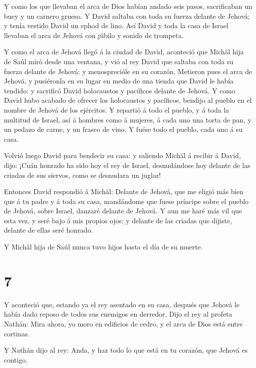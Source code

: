  Y como los que llevaban el arca de Dios habían andado seis
pasos, sacrificaban un buey y un carnero grueso.  Y David
saltaba con toda su fuerza delante de Jehová; y tenía vestido David un
ephod de lino.  Así David y toda la casa de Israel llevaban
el arca de Jehová con júbilo y sonido de trompeta.

 Y como el arca de Jehová llegó á la ciudad de David,
aconteció que Michâl hija de Saúl miró desde una ventana, y vió al rey
David que saltaba con toda su fuerza delante de Jehová: y menosprecióle
en su corazón.  Metieron pues el arca de Jehová, y
pusiéronla en su lugar en medio de una tienda que David le había
tendido: y sacrificó David holocaustos y pacíficos delante de Jehová.
 Y como David hubo acabado de ofrecer los holocaustos y
pacíficos, bendijo al pueblo en el nombre de Jehová de los ejércitos.
 Y repartió á todo el pueblo, y á toda la multitud de
Israel, así á hombres como á mujeres, á cada uno una torta de pan, y un
pedazo de carne, y un frasco de vino. Y fuése todo el pueblo, cada uno á
su casa.

 Volvió luego David para bendecir su casa: y saliendo
Michâl á recibir á David, dijo: ¡Cuán honrado ha sido hoy el rey de
Israel, desnudándose hoy delante de las criadas de sus siervos, como se
desnudara un juglar!

 Entonces David respondió á Michâl: Delante de Jehová, que
me eligió más bien que á tu padre y á toda su casa, mandándome que fuese
príncipe sobre el pueblo de Jehová, sobre Israel, danzaré delante de
Jehová.  Y aun me haré más vil que esta vez, y seré bajo á
mis propios ojos; y delante de las criadas que dijiste, delante de ellas
seré honrado.

 Y Michâl hija de Saúl nunca tuvo hijos hasta el día de su
muerte.

\hypertarget{section-6}{%
\section{7}\label{section-6}}

 Y aconteció que, estando ya el rey asentado en su casa,
después que Jehová le había dado reposo de todos sus enemigos en
derredor,  Dijo el rey al profeta Nathán: Mira ahora, yo
moro en edificios de cedro, y el arca de Dios está entre cortinas.

 Y Nathán dijo al rey: Anda, y haz todo lo que está en tu
corazón, que Jehová es contigo.

